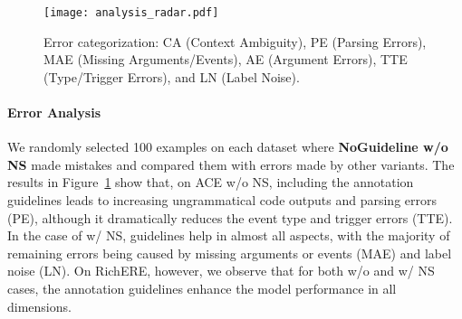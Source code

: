 \begin{figure}[t!]
    \centering
    \texttt{[image: analysis\_radar.pdf]}
    \caption{Error categorization: CA (Context Ambiguity), PE (Parsing Errors), MAE (Missing Arguments/Events), AE (Argument Errors), TTE (Type/Trigger Errors), and LN (Label Noise).
    }
    \label{fig:error_cat}
    \vspace{-1.5em}
\end{figure}

\paragraph{Error Analysis}
We randomly selected 100 examples on each dataset where \textbf{NoGuideline w/o NS} made mistakes and compared them with errors made by other variants. The results in Figure~\ref{fig:error_cat} show that, on ACE w/o NS, including the annotation guidelines leads to increasing ungrammatical code outputs and parsing errors (PE), although it dramatically reduces the event type and trigger errors (TTE). In the case of w/ NS, guidelines help in almost all aspects, with the majority of remaining errors being caused by missing arguments or events (MAE) and label noise (LN). On RichERE, however, we observe that for both w/o and w/ NS cases, the annotation guidelines enhance the model performance in all dimensions.

